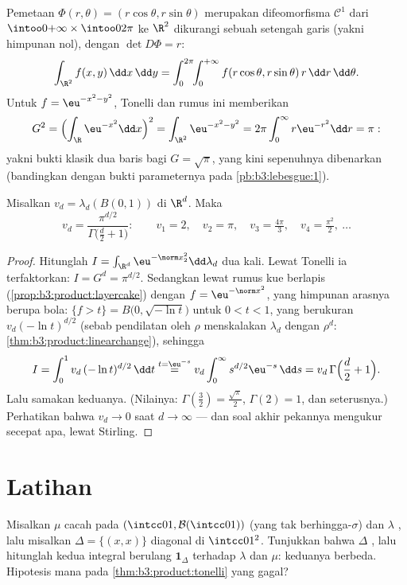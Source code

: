 \begin{example}
\label{ex:b3:product:polar}
Pemetaan $\Phi(r, \theta) = (r\cos\theta, r\sin\theta)$ merupakan difeomorfisma
$\mathcal C^1$ dari $\intoo0{+\infty}\times\intoo0{2\pi}$
ke $\R^2$ dikurangi sebuah setengah garis (yakni himpunan nol), dengan $\det D\Phi =
r$:
\[
\int_{\R^2}f(x, y)\,\dd x\,\dd y
= \int_0^{2\pi}\!\!\int_0^{+\infty}
f(r\cos\theta, r\sin\theta)\,r\,\dd r\,\dd\theta .
\]
Untuk $f = \eu^{-x^2-y^2}$, Tonelli dan rumus ini memberikan
\[
G^2 = \Bigl(\int_\R \eu^{-x^2}\dd x\Bigr)^2
= \int_{\R^2}\eu^{-x^2-y^2}
= 2\pi\int_0^\infty r\eu^{-r^2}\dd r = \pi:
\]
yakni bukti klasik dua baris bagi $G = \sqrt\pi$, yang kini sepenuhnya
dibenarkan (bandingkan dengan bukti parameternya pada
\cref{pb:b3:lebesgue:1}).
\end{example}

\begin{theorem}
\label{thm:b3:product:ballvolume}
Misalkan $v_d = \lambda_d(B(0,1))$ di $\R^d$. Maka
\[
v_d = \frac{\pi^{d/2}}{\Gamma\bigl(\frac d2 + 1\bigr)} :
\qquad
v_1 = 2,\quad v_2 = \pi,\quad v_3 = \tfrac{4\pi}3,\quad
v_4 = \tfrac{\pi^2}2,\ \dots
\]
\end{theorem}

\begin{proof}
Hitunglah $I = \int_{\R^d}\eu^{-\norm x_2^2}\dd\lambda_d$ dua kali.
Lewat Tonelli ia terfaktorkan: $I = G^d = \pi^{d/2}$. Sedangkan lewat rumus kue
berlapis (\cref{prop:b3:product:layercake}) dengan $f = \eu^{-
\norm x^2}$, yang himpunan arasnya berupa bola: $\{f > t\} =
B\bigl(0, \sqrt{-\ln t}\bigr)$ untuk $0 < t < 1$, yang berukuran
$v_d(-\ln t)^{d/2}$ (sebab pendilatan oleh $\rho$ menskalakan $\lambda_d$ dengan
$\rho^d$: \cref{thm:b3:product:linearchange}), sehingga
\[
I = \int_0^1 v_d\,(-\ln t)^{d/2}\,\dd t
\overset{t = \eu^{-s}}{=}
v_d\int_0^\infty s^{d/2}\eu^{-s}\,\dd s
= v_d\,\Gamma\Bigl(\frac d2 + 1\Bigr).
\]
Lalu samakan keduanya. (Nilainya: $\Gamma(\frac32) = \frac{\sqrt\pi}2$,
$\Gamma(2) = 1$, dan seterusnya.) Perhatikan bahwa $v_d \to 0$ saat $d \to \infty$ ---
dan soal akhir pekannya mengukur secepat apa, lewat Stirling.
\end{proof}

\section{Latihan}

\begin{exercise}[$\star$]\label{exo:b3:product:1}
Misalkan $\mu$  cacah pada $(\intcc01, \mathcal
B(\intcc01))$ (yang tak berhingga-$\sigma$) dan $\lambda$ , lalu misalkan $\Delta = \{(x,x)\}$ diagonal di
$\intcc01^2$. Tunjukkan bahwa $\Delta$ , lalu hitunglah
kedua integral berulang $\mathbf 1_\Delta$ terhadap
$\lambda$ dan $\mu$: keduanya berbeda. Hipotesis mana pada
\cref{thm:b3:product:tonelli} yang gagal?
\end{exercise}

